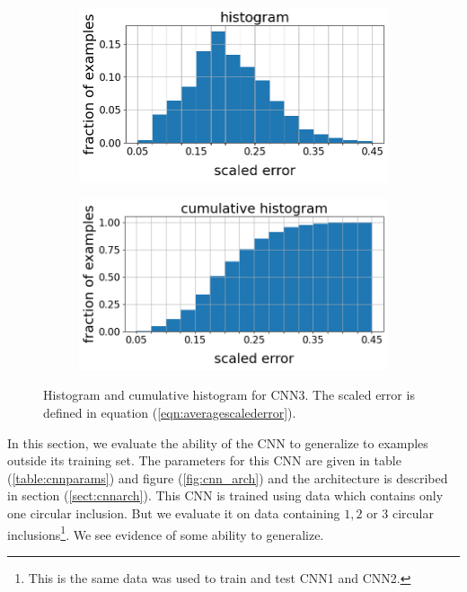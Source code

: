 \documentclass[12pt]{article}
\newcommand{\nhghalfwidth}{0.48\linewidth}
\newcommand{\nhgtotalheight}{4cm}
\begin{document}
\begin{figure}[!h]
\captionsetup[subfigure]{justification=centering}
  \centering
  \begin{subfigure}[c]{\nhghalfwidth}
    \centering
    \includegraphics[totalheight=\nhgtotalheight]{Figures/Results3New/histogram_new.png}
  \end{subfigure}
%  
  \begin{subfigure}[c]{\nhghalfwidth}
      \centering
    \includegraphics[totalheight=\nhgtotalheight]{Figures/Results3New/cumulative_new.png}
  \end{subfigure}
  \caption{\label{fig:cnn3histo} Histogram and cumulative histogram for CNN3. The scaled error is defined in equation (\ref{eqn:averagescalederror}).}
\end{figure}
%
In this section, we evaluate the ability of the CNN to generalize to examples outside its training set. The parameters for this CNN are given in table (\ref{table:cnnparams}) and figure (\ref{fig:cnn_arch}) and the architecture is described in section (\ref{sect:cnnarch}). This CNN is trained using data which contains only one circular inclusion. But we evaluate it on data containing $1,2$ or $3$ circular inclusions\footnote{This is the same data was used to train and test CNN1 and CNN2.}. We see evidence of some ability to generalize.
\end{document}
